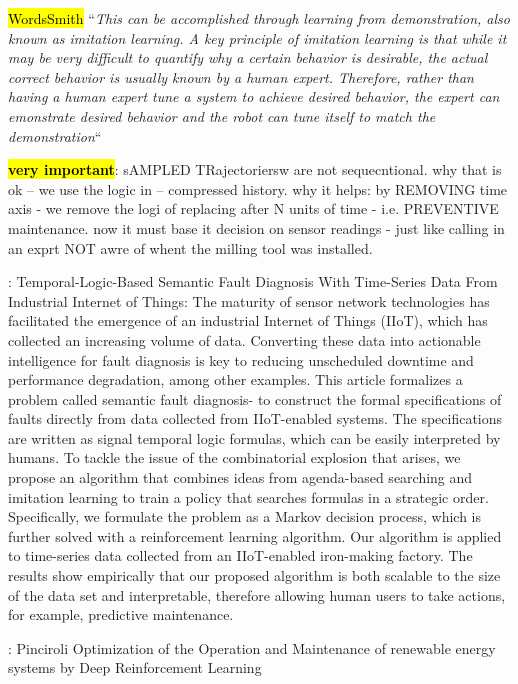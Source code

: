 \documentclass{article}
\newcommand{\hlc}[2][blue!10]{{\colorlet{foo}{#1} \sethlcolor{foo}\hl{#2}}}
\begin{document}
\hlc{WordsSmith} ``\textit{This can be accomplished through learning from demonstration, also known as imitation learning. A key principle of imitation learning is that while it may be very difficult to quantify why a certain behavior is desirable, the actual correct behavior is usually known by a human expert. Therefore, rather than having a human expert tune a system to achieve desired behavior, the expert can emonstrate desired behavior and the robot can tune itself to match the demonstration}``

\hlc{\textbf{very important}}: sAMPLED TRajectoriersw  are not sequecntional. why that is ok -- we use the logic in \cite{berant2015imitation} -- compressed history. why it helps: by REMOVING time axis - we remove the logi of replacing after N units of time - i.e. PREVENTIVE maintenance. now it must base it decision on sensor readings - just like calling in an exprt NOT awre of whent the milling tool was installed.

\cite{Chen-2021-Temporal}: Temporal-Logic-Based Semantic Fault Diagnosis With Time-Series Data From Industrial Internet of Things:
The maturity of sensor network technologies has facilitated the emergence of an industrial Internet of Things (IIoT), which has collected an increasing volume of data. Converting these data into actionable intelligence for fault diagnosis is key to reducing unscheduled downtime and performance degradation, among other examples. This article formalizes a problem called semantic fault diagnosis- to construct the formal specifications of faults directly from data collected from IIoT-enabled systems. The specifications are written as signal temporal logic formulas, which can be easily interpreted by humans. To tackle the issue of the combinatorial explosion that arises, we propose an algorithm that combines ideas from agenda-based searching and imitation learning to train a policy that searches formulas in a strategic order. Specifically, we formulate the problem as a Markov decision process, which is further solved with a reinforcement learning algorithm. Our algorithm is applied to time-series data collected from an IIoT-enabled iron-making factory. The results show empirically that our proposed algorithm is both scalable to the size of the data set and interpretable, therefore allowing human users to take actions, for example, predictive maintenance.

\cite{Pinciroli2022-752}: Pinciroli Optimization of the Operation and Maintenance of renewable energy systems by Deep Reinforcement Learning
\end{document}
